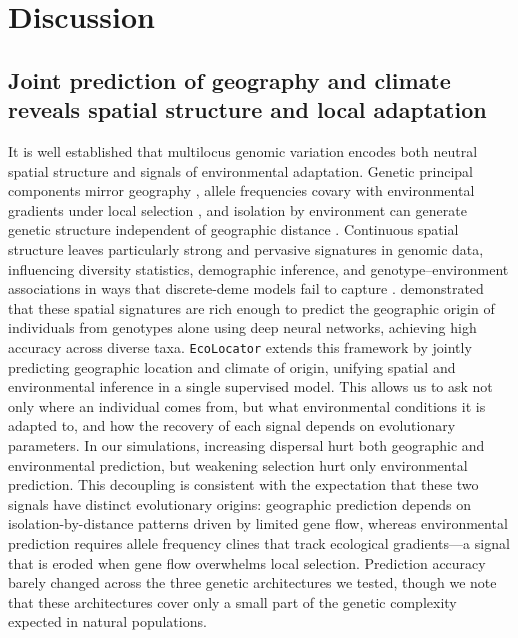 \documentclass[]{article}
\newcommand{\ecolocator}{\texttt{EcoLocator}\xspace}
\begin{document}
\section{Discussion}

\subsection{Joint prediction of geography and climate reveals
spatial structure and local adaptation}

It is well established that multilocus genomic variation
encodes both neutral spatial structure
and signals of environmental adaptation.
Genetic principal components mirror geography
\citep{novembre_genes_2008},
allele frequencies covary with environmental gradients
under local selection
\citep{coop_using_2010, savolainen_ecological_2013},
and isolation by environment can generate genetic structure
independent of geographic distance
\citep{wang_isolation_2014}.
Continuous spatial structure leaves particularly strong
and pervasive signatures in genomic data,
influencing diversity statistics, demographic inference,
and genotype--environment associations
in ways that discrete-deme models fail to capture
\citep{battey_space_2020, chevy_popgen_ecology_2025}.
\citet{battey_predicting_2020} demonstrated
that these spatial signatures are rich enough
to predict the geographic origin of individuals
from genotypes alone using deep neural networks,
achieving high accuracy across diverse taxa.
\ecolocator extends this framework
by jointly predicting geographic location
and climate of origin,
unifying spatial and environmental inference
in a single supervised model.
This allows us to ask not only where an individual comes from,
but what environmental conditions it is adapted to,
and how the recovery of each signal
depends on evolutionary parameters.
In our simulations, increasing dispersal hurt both geographic and environmental
prediction, but weakening selection hurt only environmental prediction.
This decoupling is consistent with the expectation
that these two signals have distinct evolutionary origins:
geographic prediction depends on isolation-by-distance patterns
driven by limited gene flow,
whereas environmental prediction requires
allele frequency clines that track ecological gradients---a
signal that is eroded
when gene flow overwhelms local selection.
Prediction accuracy barely changed across the three genetic architectures
we tested, though we note that these architectures cover only a small part
of the genetic complexity expected in natural populations.
\end{document}
